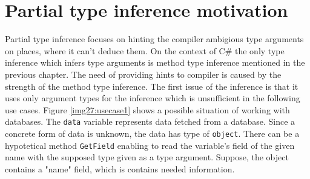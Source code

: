 \section{Partial type inference motivation}
Partial type inference focuses on hinting the compiler ambigious type arguments on places, where it can't deduce them.
On the context of C\# the only type inference which infers type arguments is method type inference mentioned in the previous chapter.
The need of providing hints to compiler is caused by the strength of the method type inference.
The first issue of the inference is that it uses only argument types for the inference which is unsufficient in the following use cases. 
Figure \ref{img27:usecase1} shows a possible situation of working with databases.
The \texttt{data} variable represents data fetched from a database.
Since a concrete form of data is unknown, the data has type of \texttt{object}.
There can be a hypotetical method \texttt{GetField} enabling to read the variable's field of the given name with the supposed type given as a type argument.
Suppose, the object contains a "name" field, which is contains needed information.


